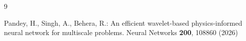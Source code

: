 \documentclass[pdflatex,sn-mathphys-num]{sn-jnl}%
\theoremstyle{thmstyleone}%
\theoremstyle{thmstyletwo}%
\theoremstyle{thmstylethree}%
\begin{document}
\begin{thebibliography}{9}

Pandey, H., Singh, A., Behera, R.:
An efficient wavelet-based physics-informed neural network for multiscale problems.
Neural Networks \textbf{200}, 108860 (2026)

\end{thebibliography}
\end{document}
